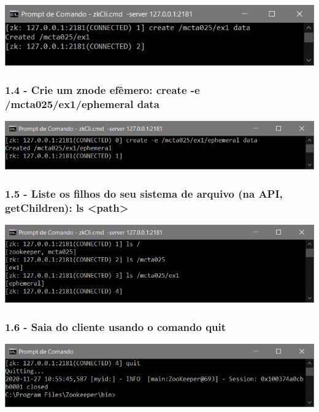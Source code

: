 \includegraphics{pratica3/prints/roteiro 1.3.PNG}

\subsubsection{1.4 - Crie um znode efêmero: create -e /mcta025/ex1/ephemeral data}

\includegraphics{pratica3/prints/roteiro 1.4.PNG}

\subsubsection{1.5 - Liste os filhos do seu sistema de arquivo (na API, getChildren): ls
<path>}

\includegraphics{pratica3/prints/roteiro 1.5.PNG}

\subsubsection{1.6 - Saia do cliente usando o comando quit}

\includegraphics{pratica3/prints/roteiro 1.6.PNG}

